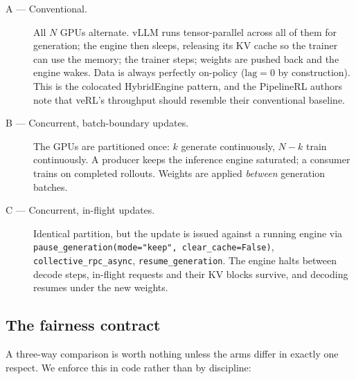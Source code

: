 \documentclass[11pt]{article}
\begin{document}
\begin{description}
\item[A --- Conventional.] All $N$ GPUs alternate. vLLM runs tensor-parallel across all of
them for generation; the engine then sleeps, releasing its KV cache so the trainer can use
the memory; the trainer steps; weights are pushed back and the engine wakes. Data is always
perfectly on-policy ($\mathrm{lag}=0$ by construction). This is the colocated HybridEngine
pattern, and the PipelineRL authors note that veRL's throughput should resemble their
conventional baseline.
\item[B --- Concurrent, batch-boundary updates.] The GPUs are partitioned once: $k$ generate
continuously, $N-k$ train continuously. A producer keeps the inference engine saturated; a
consumer trains on completed rollouts. Weights are applied \emph{between} generation batches.
\item[C --- Concurrent, in-flight updates.] Identical partition, but the update is issued
against a running engine via \texttt{pause\_generation(mode="keep",\ clear\_cache=False)},
\texttt{collective\_rpc\_async}, \texttt{resume\_generation}. The engine halts between decode
steps, in-flight requests and their KV blocks survive, and decoding resumes under the new
weights.
\end{description}

\subsection{The fairness contract}

A three-way comparison is worth nothing unless the arms differ in exactly one respect. We
enforce this in code rather than by discipline:
\end{document}
